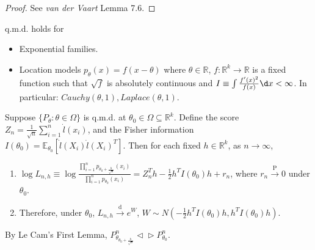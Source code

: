 \documentclass[a4paper]{article}
\begin{document}
\begin{proof}
	See \emph{van der Vaart} Lemma 7.6.
\end{proof}

\begin{note}
	q.m.d. holds for
	\begin{itemize}
		\item Exponential families.
		\item Location models $p_{\theta}(x) = f(x-\theta)$ where $\theta \in \mathbb{R}$, $f: \mathbb{R}^k \to \mathbb{R}$ is a fixed function such that $\sqrt{f}$ is absolutely continuous and $I \equiv \int \frac{f'(x)^2}{f(x)} \d x < \infty$. In particular: $Cauchy(\theta,1),Laplace(\theta,1)$. 
	\end{itemize}
\end{note}

\begin{thm}
	Suppose $\{P_{\theta}: \theta \in \Omega\}$ is q.m.d. at $\theta_0 \in \Omega \subseteq \mathbb{R}^k$. Define the score $Z_n = \frac{1}{\sqrt{n}} \sum\limits_{i=1}^n \dot{l} (x_i)$, and the Fisher information $I(\theta_0) = \mathbb{E}_{\theta_0} \left[\dot{l}(X_i) \dot{l}(X_i)^T\right]$. Then for each fixed $h \in \mathbb{R}^k$, as $n \to \infty$,
	\begin{enumerate}
		\item $\log L_{n,h} \equiv \log \frac{\prod\limits_{i=1}^n p_{\theta_0 + \frac{h}{\sqrt{n}}} (x_i)}{\prod\limits_{i=1}^n p_{\theta_0} (x_i)} = Z_n^T h - \frac{1}{2} h^T I(\theta_0) h + r_n$, where $r_n \stackrel{\text{P}}{\longrightarrow} 0$ under $\theta_0$.
		\item Therefore, under $\theta_0$, $L_{n,h} \stackrel{\text{d}}{\longrightarrow} e^W$, $W \sim N(-\frac{1}{2}h^TI(\theta_0)h,h^TI(\theta_0)h)$.
	\end{enumerate}
\end{thm}

\begin{cor}
		By Le Cam's First Lemma, $P_{\theta_{\theta_0+\frac{h}{\sqrt{n}}}}^n \vartriangleleft \vartriangleright P_{\theta_0}^n$. 
\end{cor}
\end{document}
